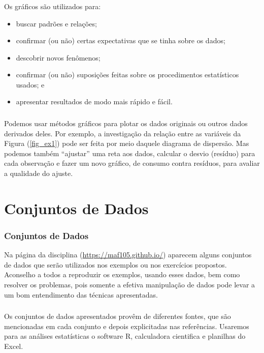 \documentclass[12pt]{beamer}
\begin{document}
\begin{frame}{}
\frametitle{}
\begin{block}{}
\justifying
Os gráficos são utilizados para:
\begin{itemize}
\item buscar padrões e relações;\pause
\item confirmar (ou não) certas expectativas que se tinha sobre os dados;\pause
\item descobrir novos fenômenos;\pause
\item confirmar (ou não) suposições feitas sobre os procedimentos estatísticos usados; e\pause
\item apresentar resultados de modo mais rápido e fácil.
\end{itemize}
\end{block}
\end{frame}

\begin{frame}{}
\frametitle{}
\begin{block}{}
\justifying
Podemos usar métodos gráficos para plotar os dados originais ou outros dados derivados
deles. Por exemplo, a investigação da relação entre as variáveis da Figura (\ref{fig_ex1}) pode ser feita por meio daquele diagrama de dispersão. Mas podemos também “ajustar” uma reta aos dados, calcular o desvio (resíduo) para cada observação e fazer um novo gráfico, de consumo contra resíduos, para avaliar a qualidade do ajuste.
\end{block}
\end{frame}

\section{Conjuntos de Dados}
\begin{frame}{}
\frametitle{Conjuntos de Dados}
\begin{block}{}
\justifying
Na página da disciplina (\url{https://maf105.github.io/}) aparecem alguns conjuntos de dados que serão utilizados nos exemplos ou nos exercícios propostos. Aconselho a todos a reproduzir os exemplos, usando esses dados, bem como resolver os problemas, pois somente a efetiva manipulação de dados pode levar a um bom entendimento das técnicas apresentadas.
\end{block}
\end{frame}

\begin{frame}{}
\frametitle{}
\begin{block}{}
\justifying
Os conjuntos de dados apresentados provêm de diferentes fontes, que são mencionadas
em cada conjunto e depois explicitadas nas referências. Usaremos para as análises estatísticas o software R, calculadora cientifica e planilhas do Excel. 
\end{block}
\end{frame}
\end{document}
